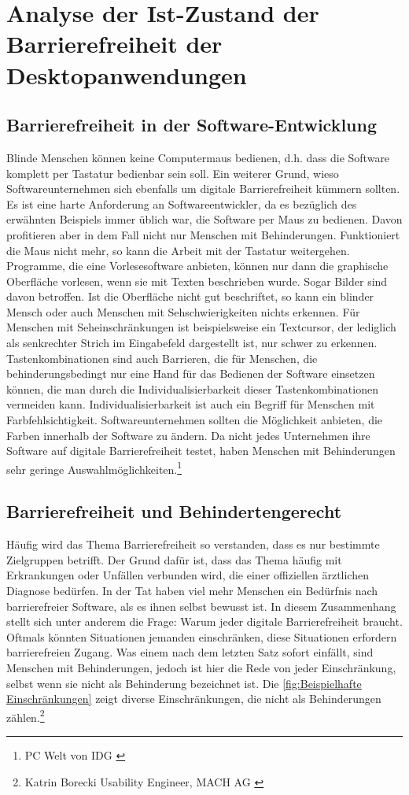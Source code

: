 \section{Analyse der Ist-Zustand der Barrierefreiheit der Desktopanwendungen}

\subsection{Barrierefreiheit in der Software-Entwicklung}
Blinde Menschen können keine Computermaus bedienen, d.h. dass die Software komplett per Tastatur bedienbar sein soll. Ein weiterer Grund, wieso Softwareunternehmen sich ebenfalls um digitale Barrierefreiheit kümmern sollten. Es ist eine harte Anforderung an Softwareentwickler, da es bezüglich des erwähnten Beispiels immer üblich war, die Software per Maus zu bedienen. Davon profitieren aber in dem Fall nicht nur Menschen mit Behinderungen. Funktioniert die Maus nicht mehr, so kann die Arbeit mit der Tastatur weitergehen. Programme, die eine Vorlesesoftware anbieten, können nur dann die graphische Oberfläche vorlesen, wenn sie mit Texten beschrieben wurde. Sogar Bilder sind davon betroffen. Ist die Oberfläche nicht gut beschriftet, so kann ein blinder Mensch oder auch Menschen mit Sehschwierigkeiten nichts erkennen. Für Menschen mit Seheinschränkungen ist beispielsweise ein Textcursor, der lediglich als senkrechter Strich im Eingabefeld dargestellt ist, nur schwer zu erkennen. Tastenkombinationen sind auch Barrieren, die für Menschen, die behinderungsbedingt nur eine Hand für das Bedienen der Software einsetzen können, die man durch die Individualisierbarkeit dieser Tastenkombinationen vermeiden kann. Individualisierbarkeit ist auch ein Begriff für Menschen mit Farbfehlsichtigkeit. Softwareunternehmen sollten die Möglichkeit anbieten, die Farben innerhalb der Software zu ändern. Da nicht jedes Unternehmen ihre Software auf digitale Barrierefreiheit testet, haben Menschen mit Behinderungen sehr geringe Auswahlmöglichkeiten.\footnote{PC Welt von IDG \cite{PcWelt}}

\subsection{Barrierefreiheit und Behindertengerecht}
\label{subsec:Barrierefreiheit und Behindertengerecht}
Häufig wird das Thema Barrierefreiheit so verstanden, dass es nur bestimmte Zielgruppen betrifft. Der Grund dafür ist, dass das Thema häufig mit Erkrankungen oder Unfällen verbunden wird, die einer offiziellen ärztlichen Diagnose bedürfen. In der Tat haben viel mehr Menschen ein Bedürfnis nach barrierefreier Software, als es ihnen selbst bewusst ist. In diesem Zusammenhang stellt sich unter anderem die Frage: Warum jeder digitale Barrierefreiheit braucht. Oftmals könnten Situationen jemanden einschränken, diese Situationen erfordern barrierefreien Zugang. Was einem nach dem letzten Satz sofort einfällt, sind Menschen mit Behinderungen, jedoch ist hier die Rede von jeder Einschränkung, selbst wenn sie nicht als Behinderung bezeichnet ist. Die \cref{fig:Beispielhafte Einschränkungen} zeigt diverse Einschränkungen, die nicht als Behinderungen zählen.\footnote{Katrin Borecki Usability Engineer, MACH AG \cite{mach}}


